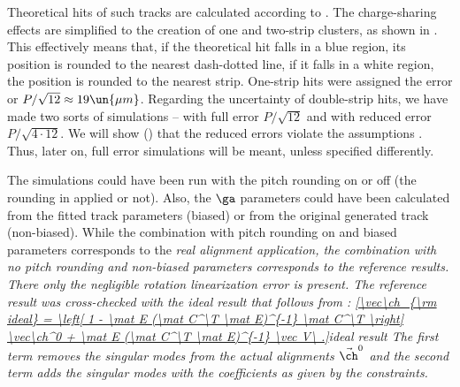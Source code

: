 Theoretical hits of such tracks are calculated according to . The charge-sharing effects are simplified to the creation of one and two-strip clusters, as shown in . This effectively means that, if the theoretical hit falls in a blue region, its position is rounded to the nearest dash-dotted line, if it falls in a white region, the position is rounded to the nearest strip. One-strip hits were assigned the error or $P/\sqrt{12}\approx 19\un{\mu m}$. Regarding the uncertainty of double-strip hits, we have made two sorts of simulations -- with full error $P/\sqrt{12}$ and with reduced error $P/\sqrt{4\cdot12}$. We will show () that the reduced errors violate the assumptions . Thus, later on, full error simulations will be meant, unless specified differently.



The simulations could have been run with the pitch rounding on or off (the rounding in  applied or not). Also, the $\ga$ parameters could have been calculated from the fitted track parameters (biased) or from the original generated track (non-biased). While the combination with pitch rounding on and biased parameters corresponds to the \em{real} alignment application, the combination with no pitch rounding and non-biased parameters corresponds to the \em{reference} results. There only the negligible rotation linearization error is present. The reference result was cross-checked with the \em{ideal} result that follows from :
\eqref{\vec\ch_{\rm ideal} = \left[ 1 - \mat E (\mat C^\T \mat E)^{-1} \mat C^\T \right] \vec\ch^0 + \mat E (\mat C^\T \mat E)^{-1} \vec V\ .}{ideal result}
The first term removes the singular modes from the actual alignments $\vec\ch^0$ and the second term adds the singular modes with the coefficients as given by the constraints. 

